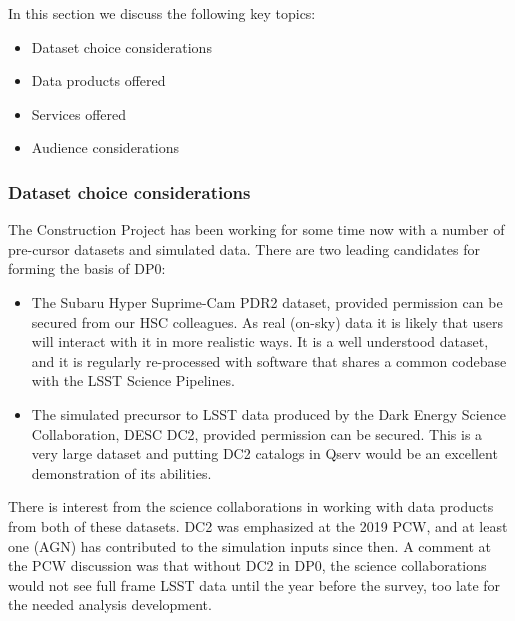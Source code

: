 In this section we discuss the following key topics:

\begin{itemize}

\item Dataset choice considerations

\item Data products offered

\item Services offered

\item Audience considerations

\end{itemize}

\subsubsection {Dataset choice considerations} \label{sec:dataset}

The Construction Project has been working for some time now with a number of pre-cursor datasets and simulated data. There are two leading candidates for forming the basis of DP0:

\begin{itemize}

\item The Subaru Hyper Suprime-Cam PDR2 dataset, provided permission can be secured from our HSC colleagues. As real (on-sky) data it is likely that users will interact with it in more realistic ways. It is a well understood dataset, and it is regularly re-processed with software that shares a common codebase with the LSST Science Pipelines.

\item The simulated precursor to LSST data produced by the Dark Energy Science Collaboration, DESC DC2, provided permission can be secured. This is a very large dataset and putting DC2 catalogs in Qserv would be an excellent demonstration of its abilities.

\end{itemize}

There is interest from the science collaborations in working with data products from both of these datasets. DC2 was emphasized at the 2019 PCW, and at least one (AGN) has contributed to the simulation inputs since then. A comment at the PCW discussion was that without DC2 in DP0, the science collaborations would not see full frame LSST data until the year before the survey, too late for the needed analysis development.

